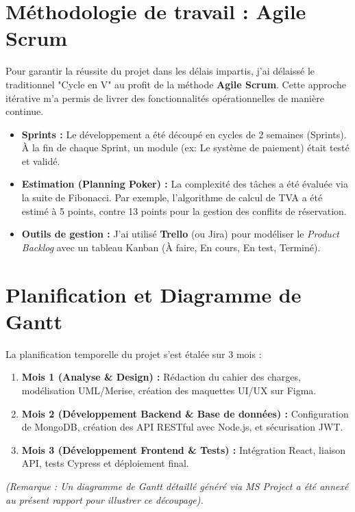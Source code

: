 \section{Méthodologie de travail : Agile Scrum}
Pour garantir la réussite du projet dans les délais impartis, j'ai délaissé le traditionnel "Cycle en V" au profit de la méthode \textbf{Agile Scrum}. Cette approche itérative m'a permis de livrer des fonctionnalités opérationnelles de manière continue.
\begin{itemize}
    \item \textbf{Sprints :} Le développement a été découpé en cycles de 2 semaines (Sprints). À la fin de chaque Sprint, un module (ex: Le système de paiement) était testé et validé.
    \item \textbf{Estimation (Planning Poker) :} La complexité des tâches a été évaluée via la suite de Fibonacci. Par exemple, l'algorithme de calcul de TVA a été estimé à 5 points, contre 13 points pour la gestion des conflits de réservation.
    \item \textbf{Outils de gestion :} J'ai utilisé \textbf{Trello} (ou Jira) pour modéliser le \textit{Product Backlog} avec un tableau Kanban (À faire, En cours, En test, Terminé).
\end{itemize}

\section{Planification et Diagramme de Gantt}
La planification temporelle du projet s'est étalée sur 3 mois :
\begin{enumerate}
    \item \textbf{Mois 1 (Analyse \& Design) :} Rédaction du cahier des charges, modélisation UML/Merise, création des maquettes UI/UX sur Figma.
    \item \textbf{Mois 2 (Développement Backend \& Base de données) :} Configuration de MongoDB, création des API RESTful avec Node.js, et sécurisation JWT.
    \item \textbf{Mois 3 (Développement Frontend \& Tests) :} Intégration React, liaison API, tests Cypress et déploiement final.
\end{enumerate}
\textit{(Remarque : Un diagramme de Gantt détaillé généré via MS Project a été annexé au présent rapport pour illustrer ce découpage).}
